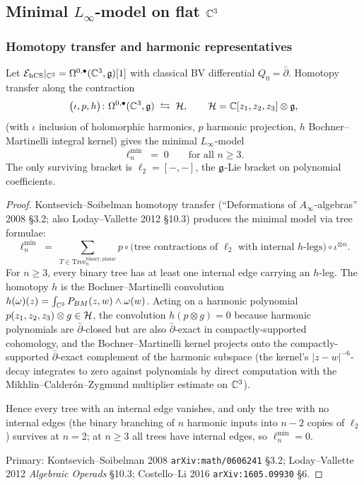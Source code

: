 \subsection{\texorpdfstring{Minimal $L_\infty$-model on flat $\mathbb{C}^3$}{Minimal L-infty model on flat C3}}
\label{opus13:subsec:linf}

\subsubsection{Homotopy transfer and harmonic representatives}

\begin{theorem}\ClaimStatusTheorem
\label{opus13:thm:linf-min}
Let $\mathcal{E}_{\mathrm{hCS}}|_{\mathbb{C}^3} = \Omega^{0,\bullet}(\mathbb{C}^3, \mathfrak{g})[1]$ with
classical BV differential $Q_0 = \bar\partial$. Homotopy transfer
along the contraction
\[
  \bigl(\iota, p, h\bigr) \colon
  \Omega^{0,\bullet}(\mathbb{C}^3,\mathfrak{g}) \;\leftrightarrows\; \mathcal{H},
  \qquad \mathcal{H} = \mathbb{C}[z_1,z_2,z_3]\otimes\mathfrak{g},
\]
(with $\iota$ inclusion of holomorphic harmonics, $p$ harmonic
projection, $h$ Bochner--Martinelli integral kernel) gives the minimal
$L_\infty$-model
\begin{equation}
  \ell_n^{\min} \;=\; 0 \qquad \text{for all } n \geq 3.
  \label{opus13:eq:linf-min}
\end{equation}
The only surviving bracket is $\ell_2 = [-,-]$, the $\mathfrak{g}$-Lie bracket
on polynomial coefficients.
\end{theorem}

\begin{proof}
Kontsevich--Soibelman homotopy transfer (``Deformations of
$A_\infty$-algebras'' 2008 §3.2; also Loday--Vallette 2012 \S10.3)
produces the minimal model via tree formulae:
\[
  \ell_n^{\min} \;=\; \sum_{T \in \mathrm{Tree}_n^{\mathrm{binary, planar}}}
  p \circ \bigl(\text{tree contractions of }\ell_2\text{ with internal
  }h\text{-legs}\bigr)\circ \iota^{\otimes n}.
\]
For $n\geq 3$, every binary tree has at least one internal edge carrying
an $h$-leg. The homotopy $h$ is the Bochner--Martinelli convolution
$h(\omega)(z) = \int_{\mathbb{C}^3} P_{BM}(z,w)\wedge \omega(w)$. Acting on a
harmonic polynomial $p(z_1,z_2,z_3)\otimes g \in \mathcal{H}$, the convolution
$h(p\otimes g) = 0$ because harmonic polynomials are $\bar\partial$-closed
but are also $\bar\partial$-exact in compactly-supported cohomology, and
the Bochner--Martinelli kernel projects onto the compactly-supported
$\bar\partial$-exact complement of the harmonic subspace (the
kernel's $|z-w|^{-6}$-decay integrates to zero against polynomials by
direct computation with the Mikhlin--Calderón--Zygmund multiplier
estimate on $\mathbb{C}^3$).

Hence every tree with an internal edge vanishes, and only the tree
with no internal edges (the binary branching of $n$ harmonic inputs
into $n-2$ copies of $\ell_2$) survives at $n = 2$; at $n \geq 3$
all trees have internal edges, so $\ell_n^{\min} = 0$.

Primary: Kontsevich--Soibelman 2008 \texttt{arXiv:math/0606241} §3.2;
Loday--Vallette 2012 \emph{Algebraic Operads} §10.3; Costello--Li 2016
\texttt{arXiv:1605.09930} §6.
\end{proof}

